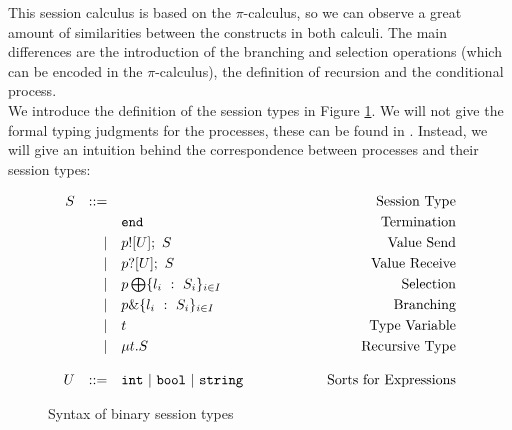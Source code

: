 \documentclass[12pt,twoside]{report}
\newcommand{\comment}[1]{}
\newcommand{\white}{\ \ \ \ \ \ \ \ \ \ \ \ }
\begin{document}
This session calculus is based on the $\pi$-calculus, so we can observe a great amount of similarities between the constructs in both calculi. The main differences are the introduction of the branching and selection operations (which can be encoded in the $\pi$-calculus), the definition of recursion and the conditional process. \\


We introduce the definition of the session types in Figure \ref{bst_session_types}. We will not give the formal typing judgments for the processes, these can be found in \cite{co406, binarysessiontypes1, subtyping}\comment{Course material ref and possibly language primitives}. Instead, we will give an intuition behind the correspondence between processes and their session types:

\begin{figure}[h]
    \centering
    \begin{equation*}
    \centering
    \begin{array}{rrlcr}
        S & ::= && \white & \text{Session\ Type} \\[2.75pt]
             &   & \texttt{end} & \white & \text{Termination}  \\[2.75pt]
             & | & p![U];\ S & \white & \text{Value\ Send} \\[2.75pt]
             & | & p?[U];\ S & \white & \text{Value\ Receive} \\[2.75pt]
             & | & p \bigoplus \{l_i\ :\ S_i\}_{i \in I} & \white& \text{Selection} \\[2.75pt]
             & | & p \& \{l_i\ :\ S_i\}_{i \in I} & \white & \text{Branching} \\[2.75pt] 
             & | & t & \white & \text{Type\ Variable} \\[2.75pt]
             & | & \mu t.S & \white & \text{Recursive\ Type}\\\\
        U & ::= & \texttt{int}\ |\ \texttt{bool}\ |\ \texttt{string}& \white & \text{Sorts\ for\ Expressions}
        \end{array}
    \end{equation*}
    \caption{Syntax of binary session types}
    \label{bst_session_types}
\end{figure}{}
\end{document}
